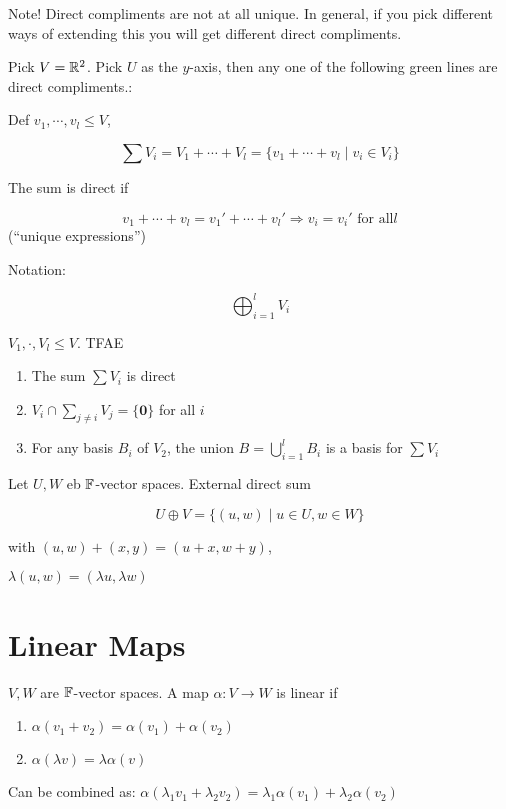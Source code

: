 \documentclass[a4paper]{article}
\begin{document}
Note! Direct compliments are not at all unique. In general, if you pick different ways of extending this you will get different direct compliments. 

Pick $ V = \mathbb{R}^{2} $. Pick $ U $ as the $ y $-axis, then any one of the following green lines are direct compliments.:

\begin{defi}
	Def $ v_{1},\cdots,v_{l} \leq V $,
	
	\[ \sum V_{i} = V_{1} + \cdots + V_{l} = \{  v_{1} + \cdots + v_{l} \; | \; v_{i} \in V_{i} \} \]
	
	The sum is direct if
	
	\[ v_{1} + \cdots + v_{l} = v_{1}' + \cdots + v_{l}' \Rightarrow v_{i} = v_{i}' \text{ for all} l \] (``unique expressions'')
	
	Notation:
	
	\[ \bigoplus_{i=1}^{l} V_{i} \]
\end{defi}
	
\begin{ex}
	$ V_{1},\cdot,V_{l} \leq V $. TFAE
	
	\begin{enumerate}
		\item The sum $ \sum V_{i} $ is direct
		\item $ V_{i} \cap \sum_{j \neq i}   V_{j} = \{ \mathbf{0} \} $ for all $ i $
		\item For any basis $ B_{i} $ of $ V_{2} $, the union $ B = \bigcup_{i=1}^{l} B_{i} $ is a basis for $ \sum V_{i}  $
		
	\end{enumerate}


\begin{defi}
	Let $ U,W $ eb $ \mathbb{F} $-vector spaces.
	External direct sum
	
	\[ U \oplus V  = \{  (u,w) \; | \; u \in U, w \in W \}\]
	
	with $ (u,w) + (x,y) = (u + x, w + y) $,
	
	$ \lambda(u,w) = (\lambda u, \lambda w) $
\end{defi}

\end{ex}


\section{Linear Maps}

\begin{defi}
	$ V,W $ are $ \mathbb{F} $-vector spaces. A map $ \alpha: V \to W $ is linear if
	
	\begin{enumerate}
		\item $ \alpha(v_{1} + v_{2}) = \alpha(v_{1}) + \alpha(v_{2}) $
		\item $ \alpha(\lambda v) = \lambda \alpha(v) $
		
	\end{enumerate}

Can be combined as: $ \alpha(\lambda_{1} v_{1} + \lambda_{2} v_{2}) = \lambda_{1} \alpha(v_{1}) + \lambda_{2} \alpha(v_{2}) $
\end{defi}
\end{document}
